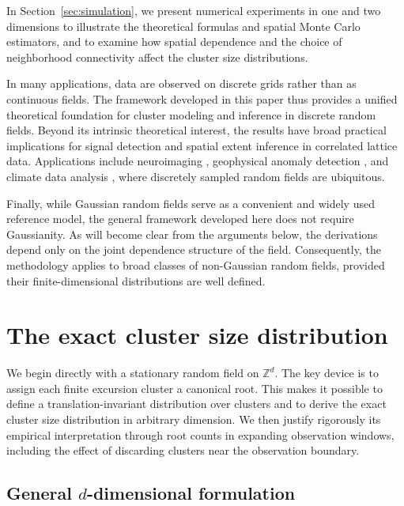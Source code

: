 \documentclass[aap,preprint]{imsart}
\theoremstyle{plain}
\theoremstyle{definition}
\def\Z{{\mathbb Z}}
\begin{document}
	In Section~\ref{sec:simulation}, we present numerical experiments in one and two dimensions to illustrate the theoretical formulas and spatial Monte Carlo estimators, and to examine how spatial dependence and the choice of neighborhood connectivity affect the cluster size distributions.
	
	In many applications, data are observed on discrete grids rather than as continuous fields. The framework developed in this paper thus provides a unified theoretical foundation for cluster modeling and inference in discrete random fields. Beyond its intrinsic theoretical interest, the results have broad practical implications for signal detection and spatial extent inference in correlated lattice data. Applications include neuroimaging \cite{Bansal:2018,Chumbley:2010,Friston:1994,Goeman:2023,Worsley:1996a}, geophysical anomaly detection \cite{Chiles:2012,Vanmercke:2010}, and climate data analysis \cite{Cooley:2007,Davison:2012}, where discretely sampled random fields are ubiquitous.
	
	Finally, while Gaussian random fields serve as a convenient and widely used reference model, the general framework developed here does not require Gaussianity. As will become clear from the arguments below, the derivations depend only on the joint dependence structure of the field. Consequently, the methodology applies to broad classes of non-Gaussian random fields, provided their finite-dimensional distributions are well defined.
	
	
	\section{The exact cluster size distribution}\label{sec:exact-cluster}
	
	We begin directly with a stationary random field on $\Z^d$. The key device is
	to assign each finite excursion cluster a canonical root. This makes it
	possible to define a translation-invariant distribution over clusters and to
	derive the exact cluster size distribution in arbitrary dimension. We then
	justify rigorously its empirical interpretation through root counts in
	expanding observation windows, including the effect of discarding clusters
	near the observation boundary. 
	
	\subsection{General $d$-dimensional formulation}
	
\end{document}
